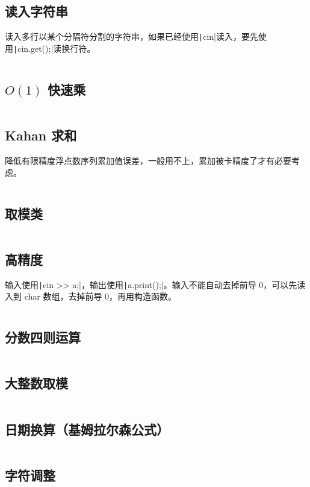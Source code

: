 \documentclass[a4paper, twoside]{article}
\begin{document}
\subsection{读入字符串}
读入多行以某个分隔符分割的字符串，如果已经使用\texttt|cin|读入，要先使用\texttt|cin.get();|读换行符。
\inputminted{cpp}{../src/杂项/读入字符串.cpp}

\subsection{$O(1)$ 快速乘}
\inputminted{cpp}{../src/杂项/O(1)快速乘.cpp}

\subsection{Kahan 求和}
降低有限精度浮点数序列累加值误差，一般用不上，累加被卡精度了才有必要考虑。
\inputminted{cpp}{../src/杂项/Kahan求和.cpp}

\subsection{取模类}
\inputminted{cpp}{../src/杂项/取模类.cpp}

\subsection{高精度}
输入使用\texttt|cin >> a;|，输出使用\texttt|a.print();|。输入不能自动去掉前导 0，可以先读入到 char 数组，去掉前导 0，再用构造函数。
\inputminted{cpp}{../src/杂项/高精度.cpp}

\subsection{分数四则运算}
\inputminted{cpp}{../src/杂项/分数四则运算.cpp}

\subsection{大整数取模}
\inputminted{cpp}{../src/杂项/大整数取模.cpp}

\subsection{日期换算（基姆拉尔森公式）}
\inputminted{cpp}{../src/杂项/日期换算（基姆拉尔森公式）.cpp}

\subsection{字符调整}
\inputminted{cpp}{../src/杂项/字符调整.cpp}
\end{document}
